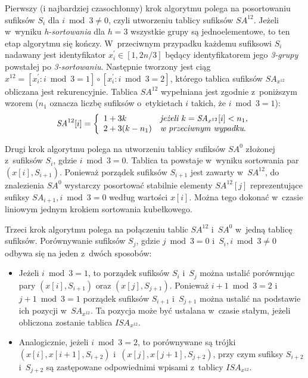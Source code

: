 \noindent
Pierwszy (i najbardziej czasochłonny) krok algorytmu polega na posortowaniu
sufiksów $S_i$ dla $i \bmod{3} \neq 0$, czyli utworzeniu tablicy sufiksów
$\textit{SA}^{12}$. Jeżeli w~wyniku \emph{h-sortowania} dla $h=3$ wszystkie
grupy są jednoelementowe, to ten etap algorytmu się kończy. W~przeciwnym przypadku
każdemu sufiksowi $S_i$ nadawany jest identyfikator $x^{'}_i
\in [ 1, 2n/3]$ będący identyfikatorem jego \emph{3-grupy} powstałej po 
\emph{3-sortowaniu}. Następnie tworzony jest ciąg $x^{12} = [x^{'}_i : i
\bmod{3} = 1] \circ [x^{'}_i : i \bmod{3} = 2]$, którego tablica sufiksów
$\textit{SA}_{x^{12}}$ obliczana jest rekurencyjnie. Tablica $\textit{SA}^{12}$
wypełniana jest zgodnie z~poniższym wzorem ($n_1$ oznacza liczbę sufiksów o~etykietach $i$ takich, że $i \bmod{3} = 1$):  
\begin{displaymath}
\textit{SA}^{12}[i] = \left\{ 
    \begin{array}{l l}
    1 + 3k          & \textit{jeżeli } k = \textit{SA}_{x^{12}}[i] <  n_1, \\
    2 + 3(k - n_1)  & \textit{w przeciwnym wypadku}.
    \end{array} 
    \right.
\end{displaymath}

Drugi krok algorytmu polega na utworzeniu tablicy sufiksów $\textit{SA}^0$
złożonej z~sufiksów $S_i$, gdzie $i \bmod{3} = 0$. Tablica ta powstaje w~wyniku
sortowania par $(x[i], S_{i+1})$. Ponieważ porządek sufiksów $S_{i+1}$ jest
zawarty w~$\textit{SA}^{12}$, do znalezienia $\textit{SA}^0$ wystarczy posortować
stabilnie elementy $\textit{SA}^{12}[j]$ reprezentujące sufiksy
$\textit{SA}_{i+1}, i \bmod{3} = 0$ według wartości $x[i]$. Można tego dokonać
w~czasie liniowym jednym krokiem sortowania kubełkowego.

Trzeci krok algorytmu polega na połączeniu tablic $\textit{SA}^{12}$ i~$\textit{SA}^0$ w~jedną 
tablicę sufiksów. Porównywanie sufiksów $S_j$, gdzie $j\bmod{3}=0$ i~$S_i, i \bmod{3} \neq 0$ 
odbywa się na jeden z~dwóch sposobów:
\begin{itemize}
    \item Jeżeli $i \bmod{3} = 1$, to porządek sufiksów $S_i$ i~$S_j$ można
  ustalić porównując pary $(x[i], S_{i+1})$ oraz $(x[j], S_{j+1})$. Ponieważ $i+1
  \bmod{3} = 2$ i~$j+1 \bmod 3 = 1$ porządek sufiksów $S_{i+1}$ i~$S_{j+1}$
  można ustalić na podstawie ich pozycji w~$\textit{SA}_{x^{12}}$. Ta pozycja może
  być ustalana w~czasie stałym, jeżeli obliczona zostanie tablica
  $\textit{ISA}_{x^{12}}$.
  
    \item Analogicznie, jeżeli $i \bmod{3} =
  2$, to porównywane są trójki $(x[i], x[i+1], S_{i+2})$ i~$(x[j], x[j+1], S_{j+2})$, przy czym 
  sufiksy $S_{i+2}$ i~$S_{j+2}$ są zastępowane odpowiednimi wpisami z~tablicy  $\textit{ISA}_{x^{12}}$.
\end{itemize}


